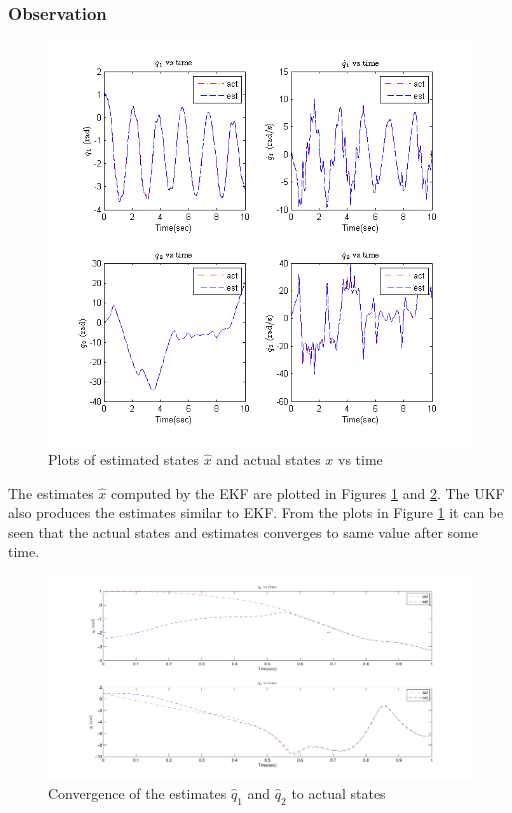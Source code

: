 \subsubsection{Observation}
\begin{figure}
	\centering
	\includegraphics[width=\textwidth, height=0.5\textheight]{Bilder/plots/idp/plot}
	\caption{ Plots of estimated states $\hat x$ and actual states $x$ vs time}
	\label{fig:idp_plot}
\end{figure}

The estimates $\hat x$ computed by the EKF are plotted in Figures \ref{fig:idp_plot} and \ref{fig:idp_init_conv}. The UKF also produces the estimates similar to EKF. From the plots in Figure \ref{fig:idp_plot} it can be seen that the actual states and estimates converges to same value after some time. 
\begin{figure}
    \centering
       \includegraphics[width=\textwidth, height=0.5\textheight]{Bilder/plots/idp/init_beh}
    \caption{ Convergence of the estimates $\hat q_1$ and $\hat q_2$ to actual states}
    \label{fig:idp_init_conv}
\end{figure}

